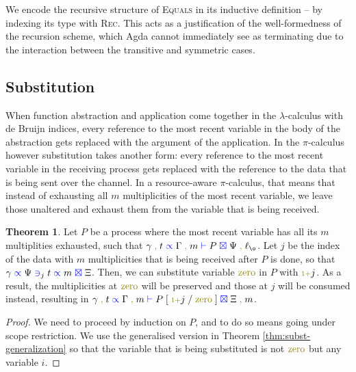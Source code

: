 \documentclass[a4paper,UKenglish,cleveref, autoref, thm-restate,authorcolumns]{lipics-v2019}
\theoremstyle{definition}
\newtheorem{nitheorem}[theorem]{Theorem}
\newcommand{\lambdacalc}{$\lambda$-calculus}
\newcommand{\picalc}{$\pi$-calculus}
\newcommand{\type}[1]{\textcolor{blue}{\operatorname{#1}}}
\newcommand{\constr}[1]{\textcolor{olive}{\operatorname{#1}}}
\newcommand{\suc}{\constr{\scriptstyle 1+}}
\newcommand{\comma}{\; \constr{,} \;}
\newcommand{\subst}[3]{#1 \; [ \; #2 \; / \;#3 \;]}
\newcommand{\types}[4]{#1 \; \type{\propto} \; #2 \; \type{\vdash} \; #3 \; \type{\boxtimes} \; #4}
\newcommand{\contains}[6]{#1 \; \type{\propto} \; #2 \; \type{\ni}_{#3} \; #4 \; \type{\propto} \; #5 \; \type{\boxtimes} \; #6}
\begin{document}
\begin{remark}
  We encode the recursive structure of \textsc{Equals} in its inductive definition -- by indexing its type with \textsc{Rec}.
  This acts as a justification of the well-formedness of the recursion scheme, which Agda cannot immediately see as terminating due to the interaction between the transitive and symmetric cases.
\end{remark}

\subsection{Substitution}
\label{substitution}

When function abstraction and application come together in the \lambdacalc{} with de Bruijn indices, every reference to the most recent variable in the body of the abstraction gets replaced with the argument of the application.
In the \picalc{} however substitution takes another form: every reference to the most recent variable in the receiving process gets replaced with the reference to the data that is being sent over the channel.
In a resource-aware \picalc{}, that means that instead of exhausting all $m$ multiplicities of the most recent variable, we leave those unaltered and exhaust them from the variable that is being received.

\begin{nitheorem}
  \label{thm:substitution}
  Let $P$ be a process where the most recent variable has all its $m$ multiplities exhausted, such that $\types{\gamma \comma t}{\Gamma \comma m}{P}{\Psi \comma \ell_{\o}}$.
  Let $j$ be the index of the data with $m$ multiplicities that is being received after $P$ is done, so that $\contains{\gamma}{\Psi}{j}{t}{m}{\Xi}$.
  Then, we can substitute variable $\constr{zero}$ in $P$ with $\suc j$.
  As a result, the multiplicities at $\constr{zero}$ will be preserved and those at $j$ will be consumed instead, resulting in $\types{\gamma \comma t}{\Gamma \comma m}{\subst{P}{\suc j}{\constr{zero}}}{\Xi \comma m}$.
\end{nitheorem}
\begin{proof}
  We need to proceed by induction on $P$, and to do so means going under scope restriction.
  We use the generalised version in Theorem \ref{thm:subst-generalization} so that the variable that is being substituted is not $\constr{zero}$ but any variable $i$.
\end{proof}
\end{document}
